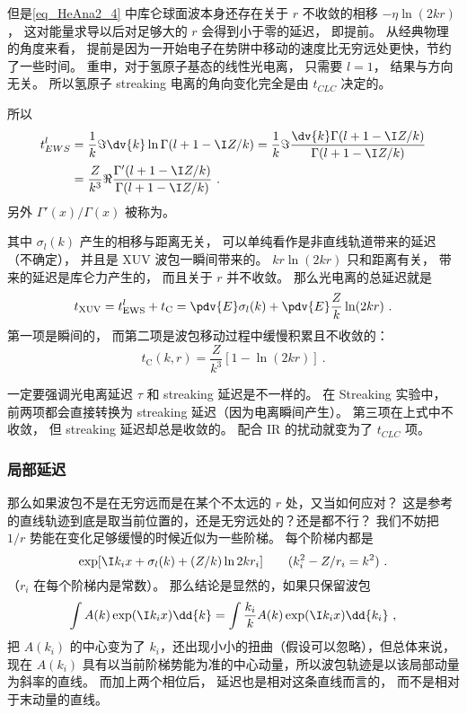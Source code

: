 但是\autoref{eq_HeAna2_4} 中库仑球面波本身还存在关于 $r$ 不收敛的相移 $-\eta\ln (2kr)$， 这对能量求导以后对足够大的 $r$ 会得到小于零的延迟， 即提前。 从经典物理的角度来看， 提前是因为一开始电子在势阱中移动的速度比无穷远处更快，节约了一些时间。 重申，对于氢原子基态的线性光电离， 只需要 $l = 1$， 结果与方向无关。 所以氢原子 streaking 电离的角向变化完全是由 $t_{CLC}$ 决定的。

所以
\begin{equation}\label{eq_tEWS}
\begin{aligned}
t_{EWS}^l &= \frac{1}{k} \Im\dv{k}\ln\Gamma(l+1-\I Z/k) = \frac{1}{k} \Im\frac{\dv{k}\Gamma(l+1-\I Z/k)}{\Gamma(l+1-\I Z/k)}\\
&= \frac{Z}{k^3} \Re\frac{\Gamma'(l+1-\I Z/k)}{\Gamma(l+1-\I Z/k)}~.
\end{aligned}
\end{equation}
另外 $\Gamma'(x)/\Gamma(x)$ 被称为。

其中 $\sigma_l(k)$ 产生的相移与距离无关， 可以单纯看作是非直线轨道带来的延迟（不确定）， 并且是 XUV 波包一瞬间带来的。 $kr\ln(2kr)$ 只和距离有关， 带来的延迟是库仑力产生的， 而且关于 $r$ 并不收敛。 那么光电离的总延迟就是
\begin{equation}\label{eq_HeAna2_5}
t_\text{XUV} = t_\text{EWS}^l + t_\text{C} = \pdv{E}\sigma_l(k) + \pdv{E}\frac{Z}{k}\ln(2kr)~. %
\end{equation}
第一项是瞬间的， 而第二项是波包移动过程中缓慢积累且不收敛的：
\begin{equation}\label{eq_t_C_def}
t_\text{C}(k, r) = \frac{Z}{k^3}[1-\ln(2kr)]~.
\end{equation}

一定要强调光电离延迟 $\tau$ 和 streaking 延迟是不一样的。 在 Streaking 实验中， 前两项都会直接转换为 streaking 延迟（因为电离瞬间产生）。 第三项在上式中不收敛， 但 streaking 延迟却总是收敛的。 配合 IR 的扰动就变为了 $t_{CLC}$ 项。

\subsubsection{局部延迟}
那么如果波包不是在无穷远而是在某个不太远的 $r$ 处，又当如何应对？ 这是参考的直线轨迹到底是取当前位置的，还是无穷远处的？还是都不行？ 我们不妨把 $1/r$ 势能在变化足够缓慢的时候近似为一些阶梯。 每个阶梯内都是
\begin{equation}
\exp[\I k_i x + \sigma_l(k) + (Z/k) \ln 2kr_i]\qquad (k_i^2 - Z/r_i = k^2)~.
\end{equation}
（$r_i$ 在每个阶梯内是常数）。 那么结论是显然的，如果只保留波包
\begin{equation}
\int A(k) \exp(\I k_i x) \dd{k} = \int \frac{k_i}{k}A(k)\exp(\I k_i x) \dd{k_i} ~,
\end{equation}
把 $A(k_i)$ 的中心变为了 $k_i$，还出现小小的扭曲（假设可以忽略），但总体来说，现在 $A(k_i)$ 具有以当前阶梯势能为准的中心动量，所以波包轨迹是以该局部动量为斜率的直线。 而加上两个相位后， 延迟也是相对这条直线而言的， 而不是相对于末动量的直线。


